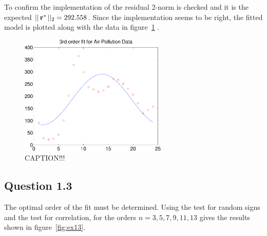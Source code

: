 To confirm the implementation of  the residual 2-norm is checked
and it is the expected $||\,\mathbf{r^*}\,||_2=292.558$. Since the implementation
seems to be right, the fitted model is plotted along with the data in
figure~\ref{fig:3rd-order-fit} .\par

\begin{figure}[ht]
    \centering
    \includegraphics[width=70mm]{../media/3rd-order-fit.pdf}
    \caption{CAPTION!!!}
    \label{fig:3rd-order-fit}
\end{figure}

\subsection*{Question 1.3}


The optimal order of the fit must be determined. Using the test for random
signs and the test for correlation, for the orders $n=3,5,7,9,11,13$ gives the
results shown in figure~\ref{fig:ex13}.


